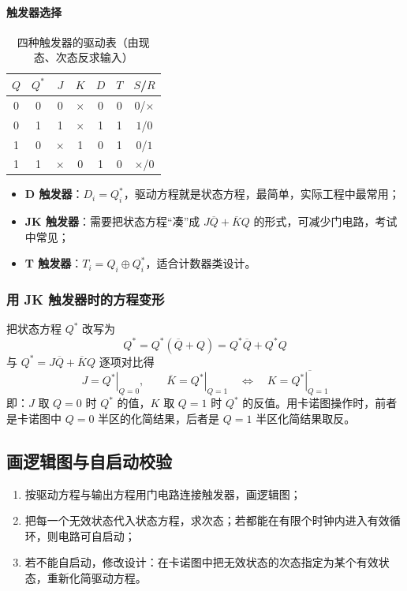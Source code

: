 \paragraph{触发器选择}
\begin{table}[!htbp]
\centering
\caption{四种触发器的驱动表（由现态、次态反求输入）}
\begin{tabular}{cc|cc|cc|c}
\toprule
$Q$ & $Q^*$ & $J$ & $K$ & $D$ & $T$ & $S$/$R$ \\
\midrule
0 & 0 & 0 & $\times$ & 0 & 0 & $0$/$\times$ \\
0 & 1 & 1 & $\times$ & 1 & 1 & $1$/$0$ \\
1 & 0 & $\times$ & 1 & 0 & 1 & $0$/$1$ \\
1 & 1 & $\times$ & 0 & 1 & 0 & $\times$/$0$ \\
\bottomrule
\end{tabular}
\end{table}

\begin{itemize}
    \item \textbf{D 触发器}：$D_i=Q_i^*$，驱动方程就是状态方程，最简单，实际工程中最常用；
    \item \textbf{JK 触发器}：需要把状态方程“凑”成 $J\overline{Q}+\overline{K}Q$ 的形式，可减少门电路，考试中常见；
    \item \textbf{T 触发器}：$T_i=Q_i\oplus Q_i^*$，适合计数器类设计。
\end{itemize}

\subsubsection{用 JK 触发器时的方程变形}
把状态方程 $Q^*$ 改写为
\begin{equation}
Q^* = Q^*(\overline{Q}+Q) = Q^*\overline{Q} + Q^*Q
\end{equation}
与 $Q^*=J\overline{Q}+\overline{K}Q$ 逐项对比得
\begin{equation}
J = \left.Q^*\right|_{Q=0},\qquad \overline{K} = \left.Q^*\right|_{Q=1}
\quad\Longleftrightarrow\quad
K = \overline{\left.Q^*\right|_{Q=1}}
\label{eq:jk_drive}
\end{equation}
即：$J$ 取 $Q=0$ 时 $Q^*$ 的值，$K$ 取 $Q=1$ 时 $Q^*$ 的反值。用卡诺图操作时，前者是卡诺图中 $Q=0$ 半区的化简结果，后者是 $Q=1$ 半区化简结果取反。

\subsection{画逻辑图与自启动校验}
\begin{enumerate}
    \item 按驱动方程与输出方程用门电路连接触发器，画逻辑图；
    \item 把每一个无效状态代入状态方程，求次态；若都能在有限个时钟内进入有效循环，则电路可自启动；
    \item 若不能自启动，修改设计：在卡诺图中把无效状态的次态指定为某个有效状态，重新化简驱动方程。
\end{enumerate}

